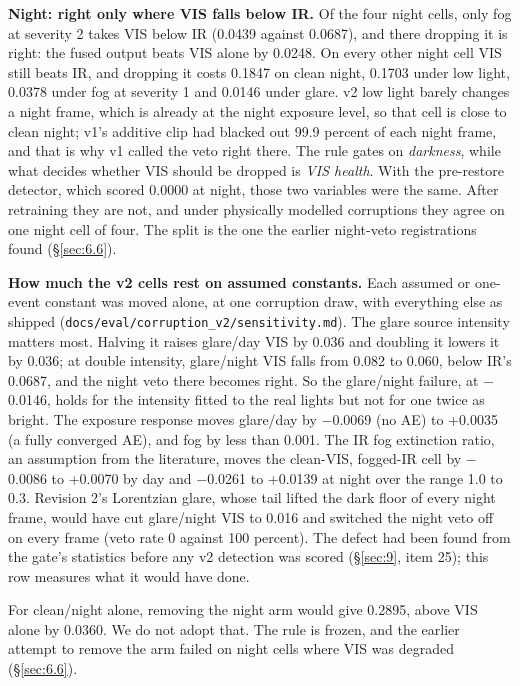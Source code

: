 \documentclass[10pt]{article}
\begin{document}
\textbf{Night: right only where VIS falls below IR.} Of the four night cells, only fog at severity 2 takes VIS below IR (0.0439 against 0.0687), and there dropping it is right: the fused output beats VIS alone by 0.0248. On every other night cell VIS still beats IR, and dropping it costs 0.1847 on clean night, 0.1703 under low light, 0.0378 under fog at severity 1 and 0.0146 under glare. v2 low light barely changes a night frame, which is already at the night exposure level, so that cell is close to clean night; v1's additive clip had blacked out 99.9 percent of each night frame, and that is why v1 called the veto right there. The rule gates on \emph{darkness}, while what decides whether VIS should be dropped is \emph{VIS health}. With the pre-restore detector, which scored 0.0000 at night, those two variables were the same. After retraining they are not, and under physically modelled corruptions they agree on one night cell of four. The split is the one the earlier night-veto registrations found (\S\ref{sec:6.6}).

\textbf{How much the v2 cells rest on assumed constants.} Each assumed or one-event constant was moved alone, at one corruption draw, with everything else as shipped (\texttt{docs/\allowbreak{}eval/\allowbreak{}corruption\_\allowbreak{}v2/\allowbreak{}sensitivity.md}). The glare source intensity matters most. Halving it raises glare/day VIS by 0.036 and doubling it lowers it by 0.036; at double intensity, glare/night VIS falls from 0.082 to 0.060, below IR's 0.0687, and the night veto there becomes right. So the glare/night failure, at $-$0.0146, holds for the intensity fitted to the real lights but not for one twice as bright. The exposure response moves glare/day by $-$0.0069 (no AE) to +0.0035 (a fully converged AE), and fog by less than 0.001. The IR fog extinction ratio, an assumption from the literature, moves the clean-VIS, fogged-IR cell by $-$0.0086 to +0.0070 by day and $-$0.0261 to +0.0139 at night over the range 1.0 to 0.3. Revision 2's Lorentzian glare, whose tail lifted the dark floor of every night frame, would have cut glare/night VIS to 0.016 and switched the night veto off on every frame (veto rate 0 against 100 percent). The defect had been found from the gate's statistics before any v2 detection was scored (\S\ref{sec:9}, item 25); this row measures what it would have done.

For clean/night alone, removing the night arm would give 0.2895, above VIS alone by 0.0360. We do not adopt that. The rule is frozen, and the earlier attempt to remove the arm failed on night cells where VIS was degraded (\S\ref{sec:6.6}).
\end{document}
